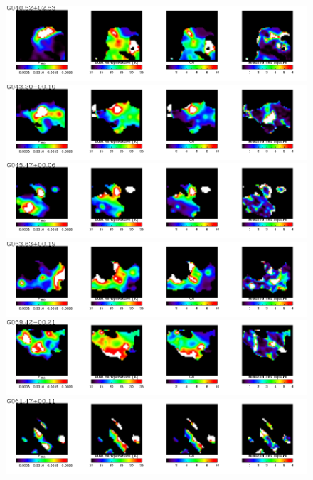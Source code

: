   \begin{figure}
\centering
\includegraphics[trim=0 2mm 0 0, clip, width=190mm]{appA/appA_12.pdf}
\includegraphics[trim=0 2mm 0 0, clip, width=190mm]{appA/appA_13.pdf}
\includegraphics[trim=0 2mm 0 0, clip, width=190mm]{appA/appA_14.pdf}
\includegraphics[trim=0 2mm 0 0, clip, width=190mm]{appA/appA_15.pdf}
\includegraphics[trim=0 2mm 0 0, clip, width=190mm]{appA/appA_16.pdf}
\includegraphics[trim=0 2mm 0 0, clip, width=190mm]{appA/appA_17.pdf}
  \end{figure}
  
